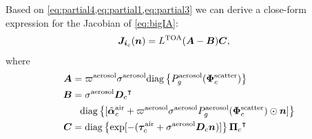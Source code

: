 \documentclass[10pt,letterpaper]{article}
\newcommand{\OpDiag}[1]{\mathrm{diag}\left\{#1\right\}}
\newcommand{\vect}[1]{\bm{#1}}
\newcommand{\transpose}[1]{{#1}^\intercal}
\begin{document}
Based on \cref{eq:partial4,eq:partial1,eq:partial3} we can derive a
close-form expression for the Jacobian of \cref{eq:bigIA}:
\begin{align}
  {\bm J}_{{\bm i}_c}({\bm n}) &= L^{\rm TOA}({\bm A}-{\bm B}){\bm C}
  ,
  \label{eq:gradient2}
\end{align}
where
\begin{align}
  \label{eq:gradient3}
  {\bm A} &= \varpi^{\rm aerosol}\sigma^{\rm aerosol}
  \OpDiag{ P_g^{\rm aerosol}(\vect{\Phi}^{\rm scatter}_c)} \nonumber\\
  {\bm B} &= {\sigma}^{\rm aerosol}\transpose{{\bm D}_c} \nonumber\\
  & \;\;\; \OpDiag{[\tilde{\vect{\alpha}}^{\rm air}_c + \varpi^{\rm
      aerosol}\sigma^{\rm aerosol} P^{\rm aerosol}_g(\vect{\Phi}^{\rm
      scatter}_c) \odot{\bm n}
    ]} \nonumber \\
  {\bm C} &= \OpDiag{\exp[-(\vect{\tau}_c^{\rm air} + {\sigma}^{\rm
      aerosol} {\bm D}_c {\bm n})]} \transpose{{\vect{\Pi}}_c}
\end{align}
\end{document}
